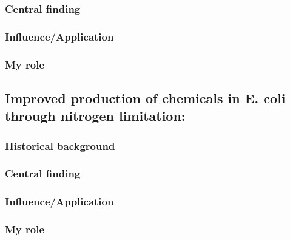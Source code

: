 \documentclass{article}
\begin{document}
\subsubsection{Central finding}
%
\subsubsection{Influence/Application}
%
\subsubsection{My role}
%
\nocite{Liu2019-nk}
\printbibliography[heading=none]

\newrefsection
\subsection{Improved production of chemicals in E. coli through nitrogen limitation:}
\subsubsection{Historical background}
%
\subsubsection{Central finding}
%
\subsubsection{Influence/Application}
%
\subsubsection{My role}
%
\nocite{Chubukov2017-uu}
\printbibliography[heading=none]
\end{document}
